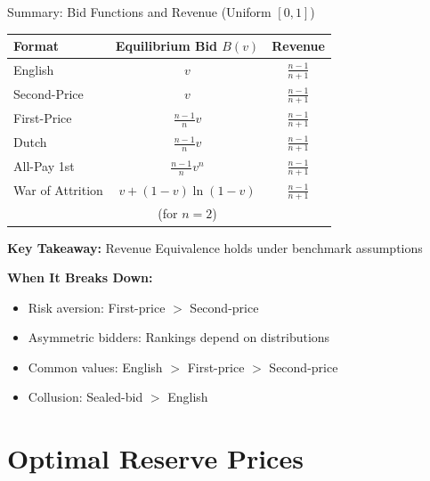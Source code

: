 \documentclass[xcolor={x11names}, aspectratio=169 ]{beamer}
\begin{document}
\begin{frame}{Summary: Bid Functions and Revenue (Uniform $[0,1]$)}
\begin{center}
\begin{tabular}{lcc}
\toprule
\textbf{Format} & \textbf{Equilibrium Bid} $B(v)$ & \textbf{Revenue} \\
\midrule
English & $v$ & $\frac{n-1}{n+1}$ \\[0.2cm]
Second-Price & $v$ & $\frac{n-1}{n+1}$ \\[0.2cm]
First-Price & $\frac{n-1}{n}v$ & $\frac{n-1}{n+1}$ \\[0.2cm]
Dutch & $\frac{n-1}{n}v$ & $\frac{n-1}{n+1}$ \\[0.2cm]
All-Pay 1st & $\frac{n-1}{n}v^n$ & $\frac{n-1}{n+1}$ \\[0.2cm]
War of Attrition & $v + (1-v)\ln(1-v)$ & $\frac{n-1}{n+1}$ \\
& (for $n=2$) & \\
\bottomrule
\end{tabular}
\end{center}

\textbf{Key Takeaway:} Revenue Equivalence holds under benchmark assumptions

\textbf{When It Breaks Down:}
\begin{itemize}
  \item Risk aversion: First-price $>$ Second-price
  \item Asymmetric bidders: Rankings depend on distributions
  \item Common values: English $>$ First-price $>$ Second-price
  \item Collusion: Sealed-bid $>$ English
\end{itemize}
\end{frame}
\section{Optimal Reserve Prices}
\end{document}
